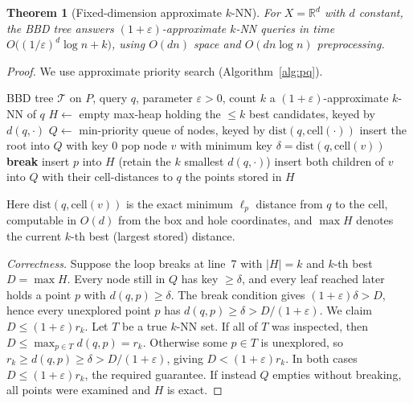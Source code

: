\documentclass{amsart}
\newtheorem{theorem}{Theorem}
\newcommand{\R}{\mathbb{R}}
\newcommand{\eps}{\varepsilon}
\begin{document}
\begin{theorem}[Fixed-dimension approximate $k$-NN]\label{thm:lowdim}
For $X=\R^d$ with $d$ constant, the BBD tree answers $(1+\eps)$-approximate $k$-NN
queries in time $O\big((1/\eps)^{d}\log n + k\big)$, using $O(dn)$ space and
$O(dn\log n)$ preprocessing.
\end{theorem}
\begin{proof}
We use approximate priority search (Algorithm~\ref{alg:pq}).

\begin{algorithm}[h]
\caption{Approximate priority search on a BBD tree}\label{alg:pq}
\begin{algorithmic}[1]
\Require BBD tree $\mathcal T$ on $P$, query $q$, parameter $\eps>0$, count $k$
\Ensure a $(1+\eps)$-approximate $k$-NN of $q$
\State $H\gets$ empty max-heap holding the $\le k$ best candidates, keyed by $d(q,\cdot)$
\State $Q\gets$ min-priority queue of nodes, keyed by $\mathrm{dist}(q,\mathrm{cell}(\cdot))$
\State insert the root into $Q$ with key $0$
  \State pop node $v$ with minimum key $\delta=\mathrm{dist}(q,\mathrm{cell}(v))$
  \If{$|H|=k$ \textbf{and} $(1+\eps)\,\delta > \max H$}
     \State \textbf{break} 
  \EndIf
     \State insert $p$ into $H$ (retain the $k$ smallest $d(q,\cdot)$)
  \Else
     \State insert both children of $v$ into $Q$ with their cell-distances to $q$
  \EndIf
\EndWhile
\State \Return the points stored in $H$
\end{algorithmic}
\end{algorithm}

Here $\mathrm{dist}(q,\mathrm{cell}(v))$ is the exact minimum $\ell_p$ distance from
$q$ to the cell, computable in $O(d)$ from the box and hole coordinates, and $\max H$
denotes the current $k$-th best (largest stored) distance.

\emph{Correctness.}  Suppose the loop breaks at line~7 with $|H|=k$ and $k$-th best
$D=\max H$.  Every node still in $Q$ has key $\ge\delta$, and every leaf reached later
holds a point $p$ with $d(q,p)\ge\delta$.  The break condition gives
$(1+\eps)\delta>D$, hence every unexplored point $p$ has
$d(q,p)\ge\delta>D/(1+\eps)$.  We claim $D\le(1+\eps)r_k$.  Let $T$ be a true $k$-NN
set.  If all of $T$ was inspected, then $D\le \max_{p\in T} d(q,p)=r_k$.  Otherwise
some $p\in T$ is unexplored, so $r_k\ge d(q,p)\ge\delta>D/(1+\eps)$, giving
$D<(1+\eps)r_k$.  In both cases $D\le(1+\eps)r_k$, the required guarantee.  If instead
$Q$ empties without breaking, all points were examined and $H$ is exact.


\end{proof}
\end{document}
